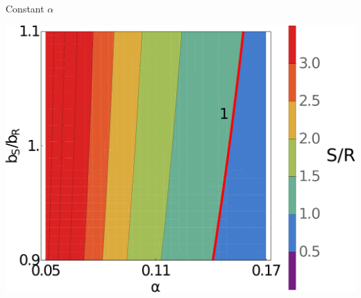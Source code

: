 \documentclass[final]{beamer}
\newlength{\sepwid}
\newlength{\onecolwid}
\newlength{\figwid}
\begin{document}
\begin{frame}[t]
\begin{block}

\begin{columns}[t]

\begin{column}{\onecolwid}

  \begin{block}{Constant $\alpha$}
  \begin{center}
    \includegraphics[width=\figwid]{../dev/graphics/poster/const_contour.pdf}
    \vspace{1.5ex}


\end{center}
\end{block}
\end{column}
\end{columns}
\end{block}
\end{frame}
\end{document}
